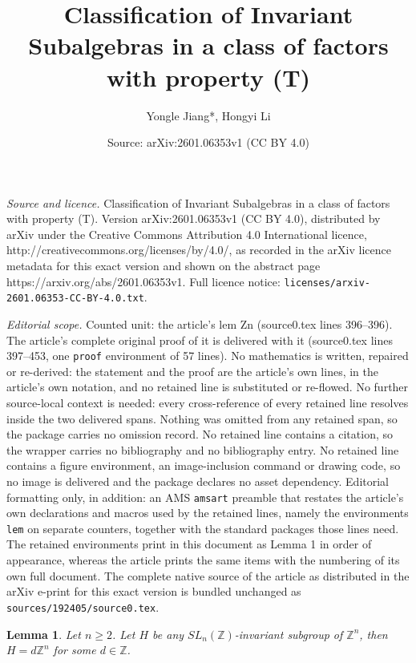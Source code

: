 \documentclass[10pt,a4paper]{amsart}
\title{Classification of Invariant Subalgebras in a class of factors with property (T)}
\author{Yongle Jiang*, Hongyi Li}
\date{Source: arXiv:2601.06353v1 (CC BY 4.0)}
\newtheorem{lem}{Lemma}
\begin{document}
\maketitle

\noindent\emph{Source and licence.} Classification of Invariant Subalgebras in a class of factors with property (T). Version arXiv:2601.06353v1 (CC BY 4.0), distributed by arXiv under the Creative Commons Attribution 4.0 International licence, http://creativecommons.org/licenses/by/4.0/, as recorded in the arXiv licence metadata for this exact version and shown on the abstract page https://arxiv.org/abs/2601.06353v1. Full licence notice: \texttt{licenses/arxiv-2601.06353-CC-BY-4.0.txt}.\par\smallskip

\noindent\textit{Editorial scope.} Counted unit: the article's lem Zn (source0.tex lines 396--396). The article's complete original proof of it is delivered with it (source0.tex lines 397--453, one \texttt{proof} environment of 57 lines). No mathematics is written, repaired or re-derived: the statement and the proof are the article's own lines, in the article's own notation, and no retained line is substituted or re-flowed.  No further source-local context is needed: every cross-reference of every retained line resolves inside the two delivered spans.  Nothing was omitted from any retained span, so the package carries no omission record.  No retained line contains a citation, so the wrapper carries no bibliography and no bibliography entry.  No retained line contains a figure environment, an image-inclusion command or drawing code, so no image is delivered and the package declares no asset dependency.  Editorial formatting only, in addition: an AMS \texttt{amsart} preamble that restates the article's own declarations and macros used by the retained lines, namely the environments \texttt{lem} on separate counters, together with the standard packages those lines need.  The retained environments print in this document as Lemma 1 in order of appearance, whereas the article prints the same items with the numbering of its own full document.  The complete native source of the article as distributed in the arXiv e-print for this exact version is bundled unchanged as \texttt{sources/192405/source0.tex}.
\begin{lem}\label{lem: invariant subgroups in Zn} Let $n\geq 2$. Let $H$ be any $SL_{n}(\mathbb{Z})$-invariant subgroup of $\mathbb{Z}^n$, then $H = d\mathbb{Z}^n$ for some $d\in \mathbb{Z}$. \end{lem}
\end{document}

